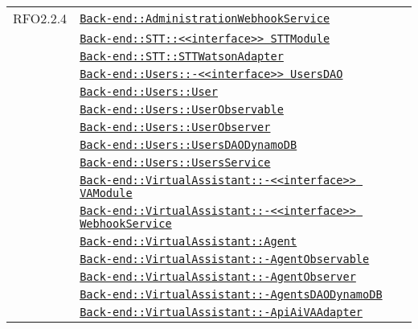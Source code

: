 \begin{longtable}{|>{\centering}m{3cm}|m{10cm}<{\centering}|}
RFO2.2.4 & \hyperref[Back-end::AdministrationWebhookService]{\texttt{Back-end::AdministrationWebhookService}}\\
& \hyperref[Back-end::STT::<<interface>> STTModule]{\texttt{Back-end::STT::<<interface>> STTModule}}\\
& \hyperref[Back-end::STT::STTWatsonAdapter]{\texttt{Back-end::STT::STTWatsonAdapter}}\\
& \hyperref[Back-end::Users::<<interface>> UsersDAO]{\texttt{Back-end::Users::-\linebreak <<interface>> UsersDAO}}\\
& \hyperref[Back-end::Users::User]{\texttt{Back-end::Users::User}}\\
& \hyperref[Back-end::Users::UserObservable]{\texttt{Back-end::Users::UserObservable}}\\
& \hyperref[Back-end::Users::UserObserver]{\texttt{Back-end::Users::UserObserver}}\\
& \hyperref[Back-end::Users::UsersDAODynamoDB]{\texttt{Back-end::Users::UsersDAODynamoDB}}\\
& \hyperref[Back-end::Users::UsersService]{\texttt{Back-end::Users::UsersService}}\\
& \hyperref[Back-end::VirtualAssistant::<<interface>> VAModule]{\texttt{Back-end::VirtualAssistant::-\linebreak <<interface>> VAModule}}\\
& \hyperref[Back-end::VirtualAssistant::<<interface>> WebhookService]{\texttt{Back-end::VirtualAssistant::-\linebreak <<interface>> WebhookService}}\\
& \hyperref[Back-end::VirtualAssistant::Agent]{\texttt{Back-end::VirtualAssistant::Agent}}\\
& \hyperref[Back-end::VirtualAssistant::AgentObservable]{\texttt{Back-end::VirtualAssistant::-\linebreak AgentObservable}}\\
& \hyperref[Back-end::VirtualAssistant::AgentObserver]{\texttt{Back-end::VirtualAssistant::-\linebreak AgentObserver}}\\
& \hyperref[Back-end::VirtualAssistant::AgentsDAODynamoDB]{\texttt{Back-end::VirtualAssistant::-\linebreak AgentsDAODynamoDB}}\\
& \hyperref[Back-end::VirtualAssistant::ApiAiVAAdapter]{\texttt{Back-end::VirtualAssistant::-\linebreak ApiAiVAAdapter}}\\

\end{longtable}
